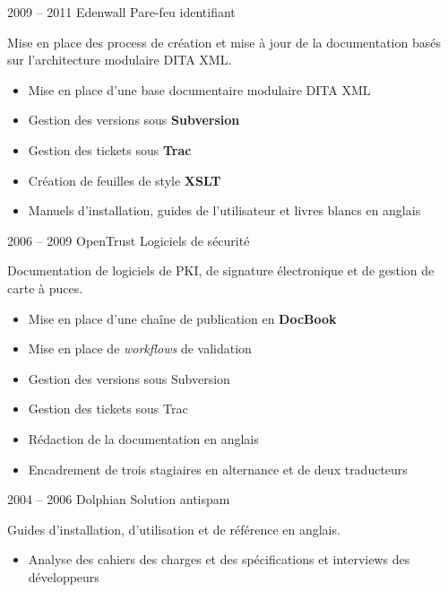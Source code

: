 \documentclass[12pt,a4paper,roman]{moderncv}
\begin{document}

\cventry
    {2009 – 2011}
    {Edenwall}
    {Pare-feu identifiant}
    {}
    {}
    {Mise en place des process de création et mise à jour de la documentation
      basés sur l'architecture modulaire DITA XML.
      \begin{itemize}
      \item Mise en place d'une base documentaire modulaire DITA XML
      \item Gestion des versions sous \textbf{Subversion}
      \item Gestion des tickets sous \textbf{Trac}
      \item Création de feuilles de style \textbf{XSLT}
      \item Manuels d'installation, guides de l'utilisateur et livres blancs en
        anglais
    \end{itemize}}


\cventry
    {2006 – 2009}
    {OpenTrust}
    {Logiciels de sécurité}
    {}
    {}
    {Documentation de logiciels de PKI, de signature électronique et
      de gestion de carte à puces.
      \begin{itemize}
      \item Mise en place d'une chaîne de publication en \textbf{DocBook}
      \item Mise en place de \textit{workflows} de validation
      \item Gestion des versions sous Subversion
      \item Gestion des tickets sous Trac
      \item Rédaction de la documentation en anglais
      \item Encadrement de trois stagiaires en alternance et de deux traducteurs
    \end{itemize}}


\cventry
    {2004 – 2006}
    {Dolphian}
    {Solution antispam}
    {}
    {}
    {Guides d'installation, d'utilisation et de référence en anglais.
      \begin{itemize}
      \item Analyse des cahiers des charges et des spécifications et interviews
        des développeurs
    \end{itemize}}

\end{document}
